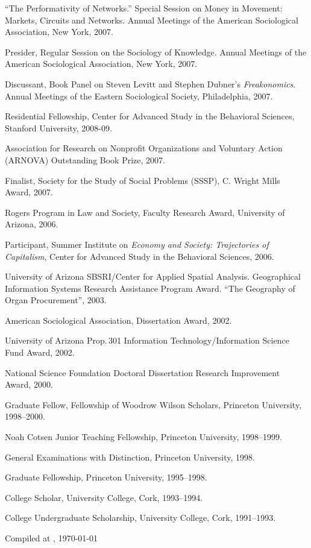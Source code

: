 \documentclass[11pt,article,oneside]{memoir}
\begin{document}
\ind ``The Performativity of Networks.'' Special Session on Money in Movement: Markets, Circuits and Networks. Annual Meetings of the American Sociological Association, New York, 2007.

\ind Presider, Regular Session on the Sociology of Knowledge. Annual Meetings of the American Sociological Association, New York, 2007. 

\ind Discussant, Book Panel on Steven Levitt and Stephen Dubner's \emph{Freakonomics}. Annual Meetings of the Eastern Sociological Society, Philadelphia, 2007. 

\bigskip 

\medskip

\ind Residential Fellowship, Center for Advanced Study in the Behavioral Sciences, Stanford University, 2008-09.

\ind Association for Research on Nonprofit Organizations and Voluntary Action (ARNOVA) Outstanding Book Prize, 2007.

\ind Finalist, Society for the Study of Social Problems (SSSP), C. Wright Mills Award, 2007.

\ind Rogers Program in Law and Society, Faculty Research Award, University of Arizona, 2006.

\ind Participant, Summer Institute on \emph{Economy and Society: Trajectories of Capitalism}, Center for Advanced Study in the Behavioral Sciences, 2006.

\ind University of Arizona SBSRI/Center for Applied Spatial
Analysis. Geographical Information Systems Research Assistance
Program Award. ``The Geography of Organ Procurement'', 2003.

\ind American Sociological Association, Dissertation Award, 2002.

\ind University of Arizona Prop.\,301 Information Technology/Information Science Fund Award, 2002.

\ind National Science Foundation Doctoral Dissertation Research Improvement Award, 2000.

\ind Graduate Fellow, Fellowship of Woodrow Wilson Scholars, Princeton University,  1998--2000. 

\ind Noah Cotsen Junior Teaching Fellowship, Princeton University, 1998--1999.

\ind General Examinations with Distinction, Princeton University, 1998.

\ind Graduate Fellowship, Princeton University, 1995--1998.

\ind College Scholar, University College, Cork, 1993--1994.

\ind College Undergraduate Scholarship, University
College, Cork, 1991--1993.

\bigskip 


\medskip

\medskip


\centering
{\tiny Compiled at \currenttime, \today}

\medskip
\end{document}
